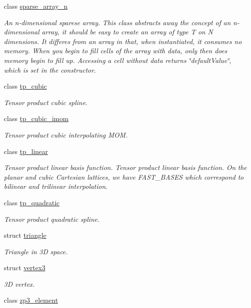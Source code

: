 \begin{DoxyCompactItemize}
class \hyperlink{classsisl_1_1sparse__array__n}{sparse\+\_\+array\+\_\+n}
\begin{DoxyCompactList}\small\item\em An n-\/dimensional sparese array. This class abstracts away the concept of an n-\/dimensional array, it should be easy to create an array of type T on N dimensions. It differes from an array in that, when instantiated, it consumes no memory. When you begin to fill cells of the array with data, only then does memory begin to fill up. Accessing a cell without data returns \char`\"{}default\+Value\char`\"{}, which is set in the constructor. \end{DoxyCompactList}\item 
class \hyperlink{classsisl_1_1tp__cubic}{tp\+\_\+cubic}
\begin{DoxyCompactList}\small\item\em Tensor product cubic spline. \end{DoxyCompactList}\item 
class \hyperlink{classsisl_1_1tp__cubic__imom}{tp\+\_\+cubic\+\_\+imom}
\begin{DoxyCompactList}\small\item\em Tensor product cubic interpolating M\+OM. \end{DoxyCompactList}\item 
class \hyperlink{classsisl_1_1tp__linear}{tp\+\_\+linear}
\begin{DoxyCompactList}\small\item\em Tensor product linear basis function. Tensor product linear basis function. On the planar and cubic Cartesian lattices, we have F\+A\+S\+T\+\_\+\+B\+A\+S\+ES which correspond to bilinear and trilinear interpolation. \end{DoxyCompactList}\item 
class \hyperlink{classsisl_1_1tp__quadratic}{tp\+\_\+quadratic}
\begin{DoxyCompactList}\small\item\em Tensor product quadratic spline. \end{DoxyCompactList}\item 
struct \hyperlink{structsisl_1_1triangle}{triangle}
\begin{DoxyCompactList}\small\item\em Triangle in 3D space. \end{DoxyCompactList}\item 
struct \hyperlink{structsisl_1_1vertex3}{vertex3}
\begin{DoxyCompactList}\small\item\em 3D vertex. \end{DoxyCompactList}\item 
class \hyperlink{classsisl_1_1zp3__element}{zp3\+\_\+element}
\end{DoxyCompactItemize}
